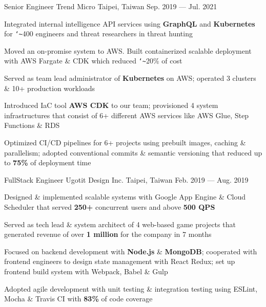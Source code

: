 \begin{cventries}
  \cventry
    {Senior Engineer } %
    {Trend Micro} %
    {Taipei, Taiwan} %
    {Sep. 2019 --- Jul. 2021} %
    {
      \begin{cvitems} %
        \item {Integrated internal intelligence API services using \textbf{GraphQL} and \textbf{Kubernetes} for \texttt{\char`\~}400 engineers and threat researchers in threat hunting}
        \item {Moved an on-promise system to AWS. Built containerized scalable deployment with AWS Fargate \& CDK which reduced \texttt{\char`\~}20\% of cost}
        \item {Served as team lead administrator of \textbf{Kubernetes} on AWS; operated 3 clusters \& 10+ production workloads}
        \item {Introduced IaC tool \textbf{AWS CDK} to our team; provisioned 4 system infrastructures that consist of 6+ different AWS services like AWS Glue, Step Functions \& RDS}
        \item {Optimized CI/CD pipelines for 6+ projects using prebuilt images, caching \& parallelism; adopted conventional commits \& semantic versioning that reduced up to \textbf{75\%} of deployment time}
      \end{cvitems}
    }

  \cventry
    {FullStack Engineer } %
    {Ugotit Design Inc.} %
    {Taipei, Taiwan} %
    {Feb. 2019 --- Aug. 2019} %
    {
      \begin{cvitems} %
        \item {Designed \& implemented scalable systems with Google App Engine \& Cloud Scheduler that served \textbf{250+} concurrent users and above \textbf{500 QPS}}
        \item {Served as tech lead \& system architect of 4 web-based game projects that generated revenue of over \textbf{1 million} for the company in 7 months}
        \item {Focused on backend development with \textbf{Node.js} \& \textbf{MongoDB}; cooperated with frontend engineers to design state management with React Redux; set up frontend build system with Webpack, Babel \& Gulp}
        \item {Adopted agile development with unit testing \& integration testing using ESLint, Mocha \& Travis CI with \textbf{83\%} of code coverage}
      \end{cvitems}
    }

\end{cventries}
